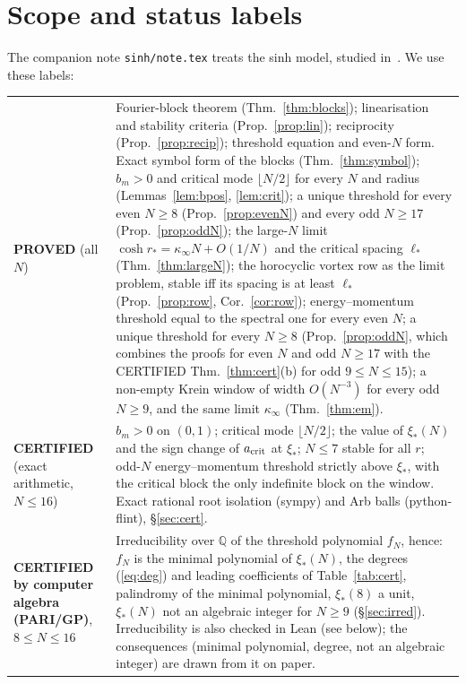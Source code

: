 \documentclass[11pt]{article}
\theoremstyle{remark}
\begin{document}
\section{Scope and status labels}
The companion note \texttt{sinh/note.tex}
treats the sinh model, studied in~\cite{MT}. We use these labels:
\begin{center}
\begin{tabular}{p{}p{}}\toprule
\textbf{PROVED} (all $N$) & Fourier-block theorem (Thm.~\ref{thm:blocks}); linearisation and stability criteria
(Prop.~\ref{prop:lin}); reciprocity (Prop.~\ref{prop:recip}); threshold equation and even-$N$ form. Exact symbol form
of the blocks (Thm.~\ref{thm:symbol}); $b_m>0$ and critical mode $\lfloor N/2\rfloor$ for every $N$ and radius
(Lemmas~\ref{lem:bpos}, \ref{lem:crit}); a unique threshold for every even $N\ge8$ (Prop.~\ref{prop:evenN}) and every
odd $N\ge17$ (Prop.~\ref{prop:oddN}); the large-$N$
limit $\cosh r_*=\kappa_\infty N+O(1/N)$ and the critical spacing $\ell_*$ (Thm.~\ref{thm:largeN}); the horocyclic
vortex row as the limit problem, stable iff its spacing is at least $\ell_*$ (Prop.~\ref{prop:row}, Cor.~\ref{cor:row}); energy--momentum
threshold equal to the spectral one for every even $N$; a unique threshold for every $N\ge8$ (Prop.~\ref{prop:oddN},
which combines the proofs for even $N$ and odd $N\ge17$ with the CERTIFIED Thm.~\ref{thm:cert}(b) for odd $9\le N\le15$); a non-empty Krein window of width $O(N^{-3})$ for every odd
$N\ge9$, and the same limit $\kappa_\infty$ (Thm.~\ref{thm:em}).\\
\textbf{CERTIFIED} (exact arithmetic, $N\le16$) & $b_m>0$ on $(0,1)$; critical mode $\lfloor N/2\rfloor$; the value of
$\xi_*(N)$ and the sign change of $a_{\rm crit}$ at $\xi_*$; $N\le7$ stable for all $r$; odd-$N$ energy--momentum
threshold strictly above $\xi_*$, with the critical block the only indefinite block on the window. Exact rational root isolation (sympy) and Arb balls (python-flint), \S\ref{sec:cert}.\\
\textbf{CERTIFIED by computer algebra (PARI/GP)}, $8\le N\le16$ & Irreducibility over $\mathbb Q$ of the threshold
polynomial $f_N$, hence: $f_N$ is the minimal polynomial of $\xi_*(N)$, the degrees (\ref{eq:deg}) and leading
coefficients of Table~\ref{tab:cert}, palindromy of the minimal polynomial, $\xi_*(8)$ a unit, $\xi_*(N)$ not an
algebraic integer for $N\ge9$ (\S\ref{sec:irred}). Irreducibility is also checked in Lean (see below); the
consequences (minimal polynomial, degree, not an algebraic integer) are drawn from it on paper.\\
\end{tabular}
\end{center}
\end{document}
